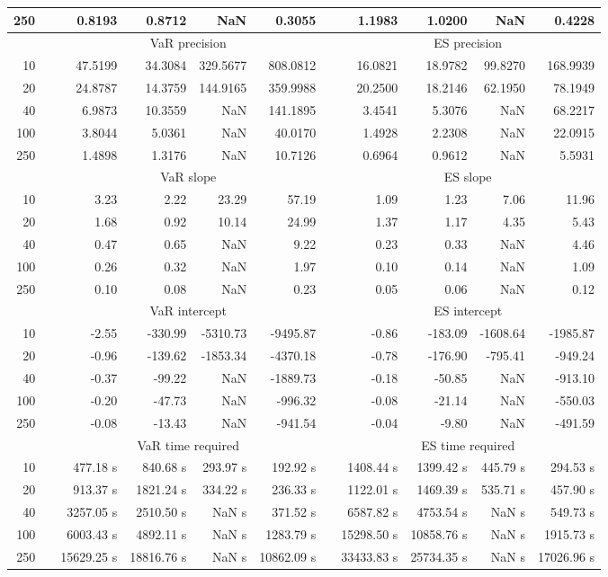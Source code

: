 {\begin{table}[h]
\begin{tabular}{rr rrrr r rrrr}
250 && 0.8193  & 0.8712  &    NaN & 0.3055 && 1.1983  & 1.0200  &    NaN & 0.4228 \\ 
\hline 
 & & \multicolumn{4}{c}{VaR precision} &&  \multicolumn{4}{c}{ES precision} \\ \cline{3-6}  \cline{8-11}
10 && 47.5199 & 34.3084 & 329.5677 & 808.0812 & & 16.0821 & 18.9782 & 99.8270 & 168.9939 \\ 
20 && 24.8787 & 14.3759 & 144.9165 & 359.9988 & & 20.2500 & 18.2146 & 62.1950 & 78.1949 \\ 
40 && 6.9873 & 10.3559 &    NaN & 141.1895 & & 3.4541 & 5.3076 &    NaN & 68.2217 \\ 
100 && 3.8044 & 5.0361 &    NaN & 40.0170 & & 1.4928 & 2.2308 &    NaN & 22.0915 \\ 
250 && 1.4898 & 1.3176 &    NaN & 10.7126 & & 0.6964 & 0.9612 &    NaN & 5.5931 \\ 
\hline 
 & & \multicolumn{4}{c}{ VaR slope} && \multicolumn{4}{c}{ES slope} \\ \cline{3-6}  \cline{8-11}
10 && 3.23 & 2.22 & 23.29 & 57.19 && 1.09 & 1.23 & 7.06 & 11.96 \\ 
20 && 1.68 & 0.92 & 10.14 & 24.99 && 1.37 & 1.17 & 4.35 & 5.43 \\ 
40 && 0.47 & 0.65 &  NaN & 9.22 && 0.23 & 0.33 &  NaN & 4.46 \\ 
100 && 0.26 & 0.32 &  NaN & 1.97 && 0.10 & 0.14 &  NaN & 1.09 \\ 
250 && 0.10 & 0.08 &  NaN & 0.23 && 0.05 & 0.06 &  NaN & 0.12 \\ 
\hline 
 & & \multicolumn{4}{c}{ VaR intercept} &&  \multicolumn{4}{c}{ES intercept} \\ \cline{3-6}  \cline{8-11}
10 && -2.55 & -330.99 & -5310.73 & -9495.87 && -0.86 & -183.09 & -1608.64 & -1985.87 \\ 
20 && -0.96 & -139.62 & -1853.34 & -4370.18 && -0.78 & -176.90 & -795.41 & -949.24 \\ 
40 && -0.37 & -99.22 &  NaN & -1889.73 && -0.18 & -50.85 &  NaN & -913.10 \\ 
100 && -0.20 & -47.73 &  NaN & -996.32 && -0.08 & -21.14 &  NaN & -550.03 \\ 
250 && -0.08 & -13.43 &  NaN & -941.54 && -0.04 & -9.80 &  NaN & -491.59 \\ 
\hline 
 & & \multicolumn{4}{c}{VaR time required} && \multicolumn{4}{c}{ES time required} \\ \cline{3-6}  \cline{8-11}
10 & & 477.18 s & 840.68 s & 293.97 s & 192.92 s && 1408.44 s & 1399.42 s & 445.79 s & 294.53 s \\ 
20 & & 913.37 s & 1821.24 s & 334.22 s & 236.33 s && 1122.01 s & 1469.39 s & 535.71 s & 457.90 s \\ 
40 & & 3257.05 s & 2510.50 s &  NaN s & 371.52 s && 6587.82 s & 4753.54 s &  NaN s & 549.73 s \\ 
100 & & 6003.43 s & 4892.11 s &  NaN s & 1283.79 s && 15298.50 s & 10858.76 s &  NaN s & 1915.73 s \\ 
250 & & 15629.25 s & 18816.76 s &  NaN s & 10862.09 s && 33433.83 s & 25734.35 s &  NaN s & 17026.96 s \\ 
\hline 
\end{tabular} 
\end{table} 
} 
